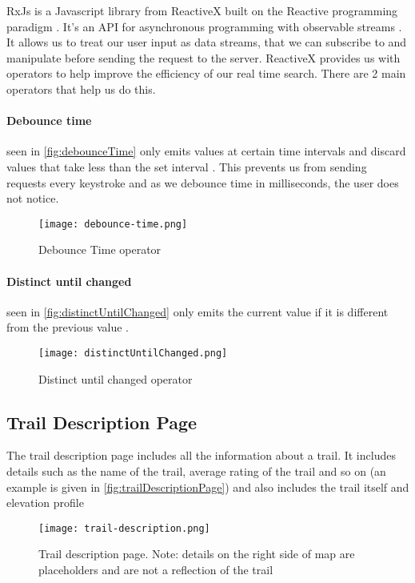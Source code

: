 RxJs is a Javascript library from ReactiveX built on the Reactive programming paradigm \cite{wan2000functional}. It's an API for asynchronous programming with observable streams \cite{reactivex2018main}. It allows us to treat our user input as data streams, that we can subscribe to and manipulate before sending the request to the server. ReactiveX provides us with operators to help improve the efficiency of our real time search. There are 2 main operators that help us do this.

\paragraph{Debounce time} seen in \autoref{fig:debounceTime} only emits values at certain time intervals and discard values that take less than the set interval \cite{leanrrxjs2019debounce}. This prevents us from sending requests every keystroke and as we debounce time in milliseconds, the user does not notice.

\begin{figure}[htb!]
    \centering
    \texttt{[image: debounce-time.png]}
    \caption{Debounce Time operator \cite{reactiveMarbles}}
    \label{fig:debounceTime}
\end{figure}

\paragraph{Distinct until changed} seen in \autoref{fig:distinctUntilChanged} only emits the current value if it is different from the previous value \cite{leanrrxjs2019distinct}.
\begin{figure}[htb!]
    \centering
    \texttt{[image: distinctUntilChanged.png]}
    \caption{Distinct until changed operator \cite{reactiveMarbles}}
    \label{fig:distinctUntilChanged}
\end{figure}

\subsection{Trail Description Page} \label{subsec:trailDescription}
The trail description page includes all the information about a trail. It includes details such as the name of the trail, average rating of the trail and so on (an example is given in \autoref{fig:trailDescriptionPage}) and also includes the trail itself and elevation profile

\begin{figure}[htb!]
    \centering
    \texttt{[image: trail-description.png]}
    \caption{Trail description page. Note: details on the right side of map are placeholders and are not a reflection of the trail}
    \label{fig:trailDescriptionPage}
\end{figure}

